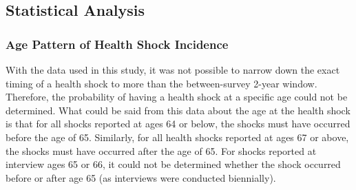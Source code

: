 %

\vspace{2mm}

\subsection{Statistical Analysis}

\subsubsection{Age Pattern of Health Shock Incidence}
\label{supsec:age_pattern_cv}
With the data used in this study, it was not possible to narrow down the exact timing of a health shock to more than the between-survey 2-year window. Therefore, the probability of having a health shock at a specific age could not be determined. What could be said from this data about the age at the health shock is that for all shocks reported at ages 64 or below, the shocks must have occurred before the age of 65. Similarly, for all health shocks reported at ages 67 or above, the shocks must have occurred after the age of 65. For shocks reported at interview ages 65 or 66, it could not be determined whether the shock occurred before or after age 65 (as interviews were conducted biennially). \\


